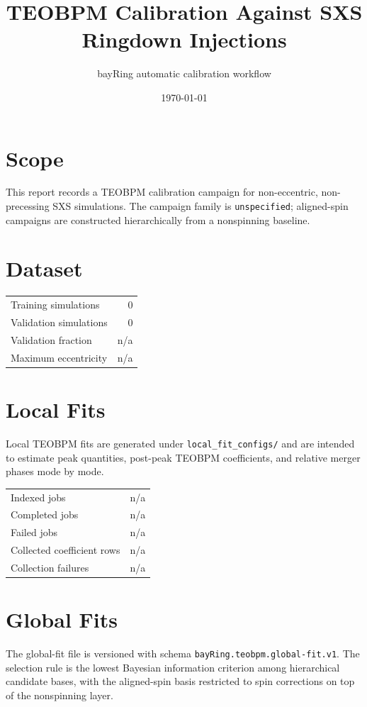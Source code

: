 \documentclass[11pt]{article}
\title{TEOBPM Calibration Against SXS Ringdown Injections}
\author{bayRing automatic calibration workflow}
\date{\today}
\begin{document}
\maketitle

\section{Scope}
This report records a TEOBPM calibration campaign for non-eccentric,
non-precessing SXS simulations. The campaign family is
\texttt{unspecified}; aligned-spin campaigns are
constructed hierarchically from a nonspinning baseline.

\section{Dataset}
\begin{tabular}{lr}
\toprule
Training simulations & 0\\
Validation simulations & 0\\
Validation fraction & n/a\\
Maximum eccentricity & n/a\\
\bottomrule
\end{tabular}

\section{Local Fits}
Local TEOBPM fits are generated under \texttt{local\_fit\_configs/} and are
intended to estimate peak quantities, post-peak TEOBPM coefficients, and
relative merger phases mode by mode.

\begin{tabular}{lr}
\toprule
Indexed jobs & n/a\\
Completed jobs & n/a\\
Failed jobs & n/a\\
Collected coefficient rows & n/a\\
Collection failures & n/a\\
\bottomrule
\end{tabular}

\section{Global Fits}
The global-fit file is versioned with schema \texttt{bayRing.teobpm.global-fit.v1}. The
selection rule is the lowest Bayesian information criterion among hierarchical
candidate bases, with the aligned-spin basis restricted to spin corrections on
top of the nonspinning layer.
\end{document}
